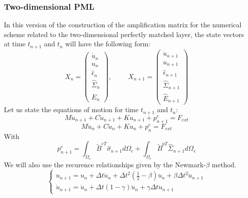 \subsubsection{Two-dimensional PML}
In this version of the construction of the amplification matrix for the numerical scheme related to the two-dimensional perfectly matched layer, the state vectors at time $t_{n+1}$ and $t_n$ will have the following form:
\begin{equation}
X_n = \begin{pmatrix}
\dot{u}_n \\
u_n \\
\hat{\epsilon}_{n} \\
\hat{\Sigma}_{n} \\
\hat{E}_{n} 
\end{pmatrix}, \hspace{1cm}
X_{n+1}= \begin{pmatrix}
\dot{u}_{n+1} \\
u_{n+1} \\
\hat{\epsilon}_{n+1} \\
\hat{\Sigma}_{n+1} \\
\hat{E}_{n+1} 
\end{pmatrix}
\end{equation}   
Let us state the equations of motion for time $t_{n+1}$ and $t_n$:
\begin{equation}
M \ddot{u}_{n+1} +C \dot{u}_{n+1} 
+K u_{n+1} + p^e_{n+1} = F_{ext}
\label{eq:motion-pmlv2-tn+1}
\end{equation}
\begin{equation}
M \ddot{u}_{n} +C \dot{u}_{n} 
+K u_{n} + p^e_{n} = F_{ext}
\label{eq:motion-pmlv2-tn}
\end{equation}
With 
\begin{equation}
p^e_{n+1} = \int_{\Omega_{e}} \tilde{B}^{eT}  \hat{\sigma}_{n+1} d\Omega_{e} + \int_{\Omega_{e}} \tilde{B}^{pT}  \hat{\Sigma}_{n+1} d\Omega_{e}
\label{eq:v2-internal-forces}
\end{equation}
We will also use the recurence relationships given by the Newmark-$\beta$ method.
\begin{equation}
	\begin{cases}
		u_{n+1} = u_n + \Delta t \dot{u}_n + \Delta t^2 \left(\frac{1}{2}-\beta\right)\ddot{u}_n + \beta \Delta t^2 \ddot{u}_{n+1} \\
		\dot{u}_{n+1} = \dot{u}_n + \Delta t (1-\gamma) \ddot{u}_n + \gamma \Delta t \ddot{u}_{n+1}
	\end{cases}
	\label{eq:Newmark-relationsV2}
\end{equation}
